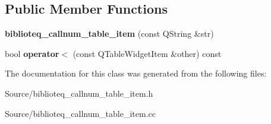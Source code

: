 \subsection*{Public Member Functions}
\begin{DoxyCompactItemize}
\item 
{\bfseries biblioteq\+\_\+callnum\+\_\+table\+\_\+item} (const Q\+String \&str)\hypertarget{classbiblioteq__callnum__table__item_aefca59d2ee38775e9f03c3bfb1b9128d}{}\label{classbiblioteq__callnum__table__item_aefca59d2ee38775e9f03c3bfb1b9128d}

\item 
bool {\bfseries operator$<$} (const Q\+Table\+Widget\+Item \&other) const \hypertarget{classbiblioteq__callnum__table__item_a45f885106fa28e607ac09e8503ccd987}{}\label{classbiblioteq__callnum__table__item_a45f885106fa28e607ac09e8503ccd987}

\end{DoxyCompactItemize}


The documentation for this class was generated from the following files\+:\begin{DoxyCompactItemize}
\item 
Source/biblioteq\+\_\+callnum\+\_\+table\+\_\+item.\+h\item 
Source/biblioteq\+\_\+callnum\+\_\+table\+\_\+item.\+cc\end{DoxyCompactItemize}
